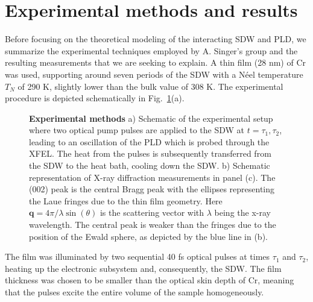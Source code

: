 \section{Experimental methods and results \label{sec:Cr_experiment}}
Before focusing on the theoretical modeling of the interacting SDW and PLD, we summarize the experimental techniques employed by A. Singer's group and the resulting measurements that we are seeking to explain.
A thin film (28 nm) of Cr was used, supporting around seven periods of the SDW with a N\'eel temperature $T_N$ of 290 K, slightly lower than the bulk value of 308 K.
The experimental procedure is depicted schematically in Fig.~\ref{fig:Cr_schematic}(a). 
\begin{figure}[h]
\caption{\label{fig:Cr_schematic}{\bf Experimental methods} a) Schematic of the experimental setup where two optical pump pulses are applied to the SDW at $t=\tau_1,\tau_2$, leading to an oscillation of the PLD which is probed through the XFEL. The heat from the pulses is subsequently transferred from the SDW to the heat bath, cooling down the SDW. b) Schematic representation of X-ray diffraction measurements in panel (c). The (002) peak is the central Bragg peak with the ellipses representing the Laue fringes due to the thin film geometry. Here $\bm q=4\pi/\lambda \sin(\theta)$ is the scattering vector with $\lambda$ being the x-ray wavelength. The central peak is weaker than the fringes due to the position of the Ewald sphere, as depicted by the blue line in (b).}
\end{figure}
The film was illuminated by two sequential 40 fs optical pulses at times $\tau_1$ and $\tau_2$, heating up the electronic subsystem and, consequently, the SDW.
The film thickness was chosen to be smaller than the optical skin depth of Cr, meaning that the pulses excite the entire volume of the sample homogeneously.

